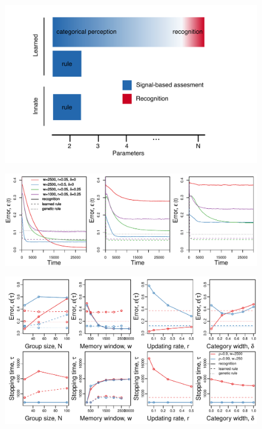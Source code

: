 \clearpage
\setcounter{figure}{0}

\begin{figure}
\includegraphics[width=6.85in]{figures/schematic_cropped.png}
\caption{}
\end{figure}

\begin{figure}
\includegraphics[width=6.85in]{figures/learning_curves.pdf}
\caption{}
\end{figure}


\begin{figure}
\includegraphics[width=6.85in]{figures/parameters_exploration.pdf}
\caption{}
\end{figure}


